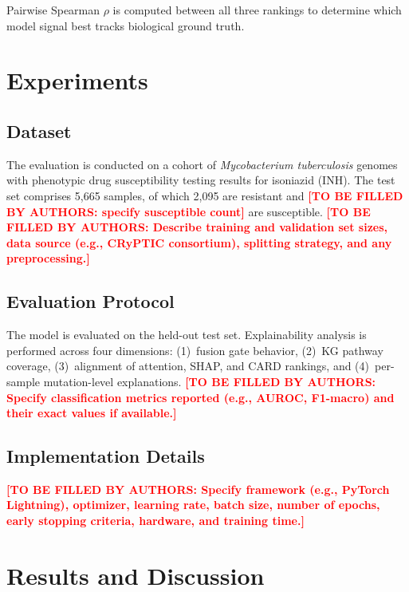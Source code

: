\documentclass[conference]{IEEEtran}
\newcommand{\tbd}[1]{\textcolor{red}{\textbf{[TO BE FILLED BY AUTHORS: #1]}}}
\begin{document}
Pairwise Spearman $\rho$ is computed between all three rankings to determine which model signal best tracks biological ground truth.

\section{Experiments}

\subsection{Dataset}

The evaluation is conducted on a cohort of \textit{Mycobacterium tuberculosis} genomes with phenotypic drug susceptibility testing results for isoniazid (INH). The test set comprises 5{,}665 samples, of which 2{,}095 are resistant and \tbd{specify susceptible count} are susceptible. \tbd{Describe training and validation set sizes, data source (e.g., CRyPTIC consortium), splitting strategy, and any preprocessing.}

\subsection{Evaluation Protocol}

The model is evaluated on the held-out test set. Explainability analysis is performed across four dimensions: (1)~fusion gate behavior, (2)~KG pathway coverage, (3)~alignment of attention, SHAP, and CARD rankings, and (4)~per-sample mutation-level explanations. \tbd{Specify classification metrics reported (e.g., AUROC, F1-macro) and their exact values if available.}

\subsection{Implementation Details}

\tbd{Specify framework (e.g., PyTorch Lightning), optimizer, learning rate, batch size, number of epochs, early stopping criteria, hardware, and training time.}

\section{Results and Discussion}
\end{document}
